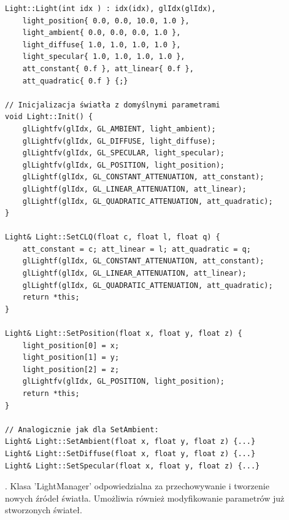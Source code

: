 \documentclass[a4paper,11pt]{article}
\begin{document}
\begin{verbatim}
Light::Light(int idx ) : idx(idx), glIdx(glIdx),
	light_position{ 0.0, 0.0, 10.0, 1.0 }, 
	light_ambient{ 0.0, 0.0, 0.0, 1.0 },
	light_diffuse{ 1.0, 1.0, 1.0, 1.0 }, 
	light_specular{ 1.0, 1.0, 1.0, 1.0 },
	att_constant{ 0.f }, att_linear{ 0.f }, 
	att_quadratic{ 0.f } {;}

// Inicjalizacja światła z domyślnymi parametrami
void Light::Init() {
	glLightfv(glIdx, GL_AMBIENT, light_ambient);
	glLightfv(glIdx, GL_DIFFUSE, light_diffuse);
	glLightfv(glIdx, GL_SPECULAR, light_specular);
	glLightfv(glIdx, GL_POSITION, light_position);
	glLightf(glIdx, GL_CONSTANT_ATTENUATION, att_constant);
	glLightf(glIdx, GL_LINEAR_ATTENUATION, att_linear);
	glLightf(glIdx, GL_QUADRATIC_ATTENUATION, att_quadratic);
}

Light& Light::SetCLQ(float c, float l, float q) {
	att_constant = c; att_linear = l; att_quadratic = q;
	glLightf(glIdx, GL_CONSTANT_ATTENUATION, att_constant);
	glLightf(glIdx, GL_LINEAR_ATTENUATION, att_linear);
	glLightf(glIdx, GL_QUADRATIC_ATTENUATION, att_quadratic);
	return *this;
}

Light& Light::SetPosition(float x, float y, float z) {
	light_position[0] = x;
	light_position[1] = y;
	light_position[2] = z;
	glLightfv(glIdx, GL_POSITION, light_position);
	return *this;
}

// Analogicznie jak dla SetAmbient:
Light& Light::SetAmbient(float x, float y, float z) {...}
Light& Light::SetDiffuse(float x, float y, float z) {...}
Light& Light::SetSpecular(float x, float y, float z) {...}

\end{verbatim}
\newpage

. Klasa 'LightManager' odpowiedzialna za przechowywanie i tworzenie \\
nowych źródeł światła. Umożliwia również modyfikowanie parametrów już stworzonych świateł.
\end{document}
